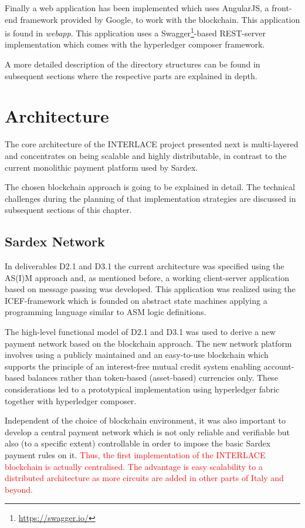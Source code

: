 Finally a web application has been implemented which uses AngularJS, a front-end framework provided by Google,  to work with the blockchain. This application is found in \textit{webapp}. This application uses a Swagger\footnote{\url{https://swagger.io/}}-based REST-server implementation which comes with the hyperledger composer framework.

A more detailed description of the directory structures can be found in subsequent sections where the respective parts are explained in depth.

\section{Architecture}

The core architecture of the INTERLACE project presented next is multi-layered and concentrates on being scalable and highly distributable, in contrast to the current monolithic payment platform used by Sardex.

The chosen blockchain approach is going to be explained in detail. The technical challenges during the planning of that implementation strategies are discussed in subsequent sections of this chapter.

\subsection{Sardex Network}

In deliverables D2.1 and D3.1 the current architecture was specified using the AS(I)M approach and, as mentioned before, a working client-server application based on message passing was developed. This application was realized using the ICEF-framework which is founded on abstract state machines applying a programming language similar to ASM logic definitions.

The high-level functional model of D2.1 and D3.1 was used to derive a new payment network based on the blockchain approach. The new network platform involves using a publicly maintained and an easy-to-use blockchain which supports the principle of an interest-free mutual credit system enabling account-based balances rather than token-based (asset-based) currencies only. These considerations led to a prototypical implementation using hyperledger fabric together with hyperledger composer.

Independent of the choice of blockchain environment, it was also important to develop a central payment network which is not only reliable and verifiable but also (to a specific extent) controllable in order to impose the basic Sardex payment rules on it. \textcolor{red}{Thus, the first implementation of the INTERLACE blockchain is actually centralised. The advantage is easy scalability to a distributed architecture as more circuits are added in other parts of Italy and beyond.}

